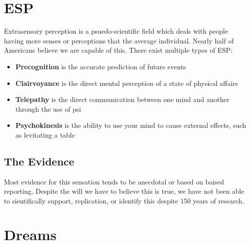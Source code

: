 \documentclass[12pt]{article}
\begin{document}
\section*{ESP}
Extrasensory perception is a psuedo-scientific field which deals with people having more senses or perceptions that the average individual. Nearly half of Americans believe we are capable of this. There exist multiple types of ESP:
\begin{itemize}
\item {\bf Precognition} is the accurate prediction of future events
\item {\bf Clairvoyance} is the direct mental perception of a state of physical affairs
\item {\bf Telepathy} is the direct communication between one mind and another through the use of psi
\item {\bf Psychokinesis} is the ability to use your mind to cause external effects, such as levitating a table
\end{itemize}

\subsection*{The Evidence}
Most evidence for this sensation tends to be anecdotal or based on baised reporting. Despite the will we have to believe this is true, we have not been able to sientifically support, replication, or identify this despite 150 years of research.

\section*{Dreams}
\end{document}
